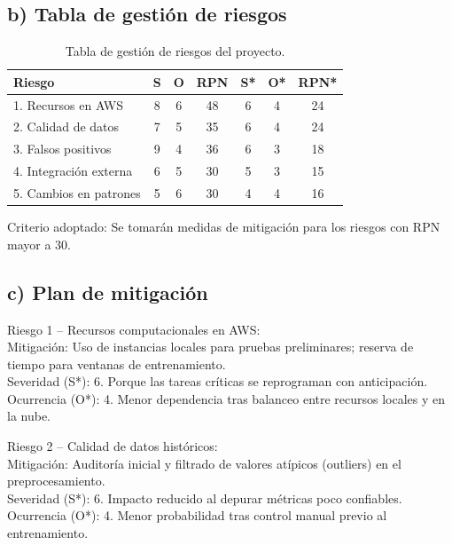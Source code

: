 \documentclass[
11pt, %
]{charter}
\begin{document}
\vspace{0.5cm}
\subsection*{b) Tabla de gestión de riesgos}

\begin{table}[H]
\centering
\begin{tabular}{|l|c|c|c|c|c|c|}
\hline
Riesgo & S & O & RPN & S* & O* & RPN* \\
\hline
1. Recursos en AWS & 8 & 6 & 48 & 6 & 4 & 24 \\\hline
2. Calidad de datos & 7 & 5 & 35 & 6 & 4 & 24 \\\hline
3. Falsos positivos & 9 & 4 & 36 & 6 & 3 & 18 \\\hline
4. Integración externa & 6 & 5 & 30 & 5 & 3 & 15 \\\hline
5. Cambios en patrones & 5 & 6 & 30 & 4 & 4 & 16 \\
\hline
\end{tabular}
\caption{Tabla de gestión de riesgos del proyecto.}
\end{table}

\vspace{0.2cm}
Criterio adoptado: Se tomarán medidas de mitigación para los riesgos con RPN mayor a 30.

\vspace{0.5cm}
\subsection*{c) Plan de mitigación}

Riesgo 1 – Recursos computacionales en AWS: \\
Mitigación: Uso de instancias locales para pruebas preliminares; reserva de tiempo para ventanas de entrenamiento. \\
Severidad (S*): 6. Porque las tareas críticas se reprograman con anticipación. \\
Ocurrencia (O*): 4. Menor dependencia tras balanceo entre recursos locales y en la nube.

\vspace{0.2cm}
Riesgo 2 – Calidad de datos históricos: \\
Mitigación: Auditoría inicial y filtrado de valores atípicos (outliers) en el preprocesamiento. \\
Severidad (S*): 6. Impacto reducido al depurar métricas poco confiables. \\
Ocurrencia (O*): 4. Menor probabilidad tras control manual previo al entrenamiento.
\end{document}
